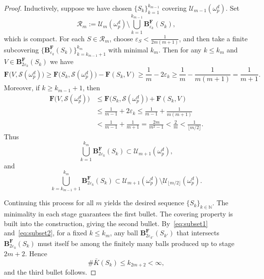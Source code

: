 \documentclass[10pt,a4paper]{amsart}
\begin{document}
\begin{proof}
Inductively, suppose we have chosen \(\{S_k\}_{k=1}^{k_{m-1}}\) covering \(\mathcal{U}_{m-1}(\omega^d_p)\). Set
\[
    \mathcal R_m := \mathcal{U}_m(\omega^d_p)\setminus\bigcup_{k=1}^{k_{m-1}}\mathbf B^\mathbf F_{\varepsilon_k}(S_k),
\]
which is compact. For each \(S\in\mathcal R_m \), choose \(\varepsilon_S<\tfrac{1}{2m(m+1)}\), and then take a finite subcovering \(\{\mathbf B^\mathbf F_{\varepsilon_k}(S_k)\}_{k=k_{m-1}+1}^{k_m}\) with minimal \(k_m\). Then for any \(k\le k_m\) and \(V\in\mathbf B^\mathbf F_{2\varepsilon_k}(S_k)\) we have
\[
    \mathbf{F}\bigl(V, \mathcal{S}(\omega^d_p)\bigr) \geq \mathbf{F}\bigl(S_k, \mathcal{S}(\omega^d_p)\bigr) - \mathbf{F}(S_k, V) \geq \frac{1}{m} - 2\varepsilon_k \geq \frac{1}{m} - \frac{1}{m(m+1)} = \frac{1}{m+1}.
\]
Moreover, if \(k\ge k_{m-1}+1\), then
\begin{align*}
    \mathbf{F}\bigl(V, \mathcal{S}(\omega^d_p)\bigr) &\leq \mathbf{F}\bigl(S_k, \mathcal{S}(\omega^d_p)\bigr) + \mathbf{F}(S_k, V) \\
    &\leq \frac{1}{m-1} + 2\varepsilon_k \leq \frac{1}{m-1} + \frac{1}{m(m+1)} \\
    &< \frac{1}{m-1} + \frac{1}{m+1} = \frac{2m}{m^2 - 1} < \frac{2}{m} < \frac{1}{\lfloor m/2\rfloor}.
\end{align*}
Thus
\begin{equation}\label{eq:subset1}
    \bigcup_{k=1}^{k_m}\mathbf B^\mathbf F_{2\varepsilon_k}(S_k) \subset \mathcal{U}_{m+1}(\omega^d_p),
\end{equation}
and
\begin{equation}\label{eq:subset2}
    \bigcup_{k=k_{m-1}+1}^{k_m}\mathbf B^\mathbf F_{2\varepsilon_k}(S_k)
    \subset \mathcal{U}_{m+1}(\omega^d_p)\setminus\mathcal{U}_{\lfloor m/2\rfloor}(\omega^d_p).
\end{equation}

Continuing this process for all \(m\) yields the desired sequence \(\{S_k\}_{k\in\mathbb N}\). The minimality in each stage guarantees the first bullet. The covering property is built into the construction, giving the second bullet. By~\eqref{eq:subset1} and~\eqref{eq:subset2}, for a fixed \(k\le k_m\), any ball \(\mathbf B^\mathbf F_{2\varepsilon_{k'}}(S_{k'})\) that intersects \(\mathbf B^\mathbf F_{2\varepsilon_k}(S_k)\) must itself be among the finitely many balls produced up to stage \(2m+2\). Hence
\[
    \#\bar K(S_k)\le k_{2m+2}<\infty,
\]
and the third bullet follows.



\end{proof}
\end{document}
